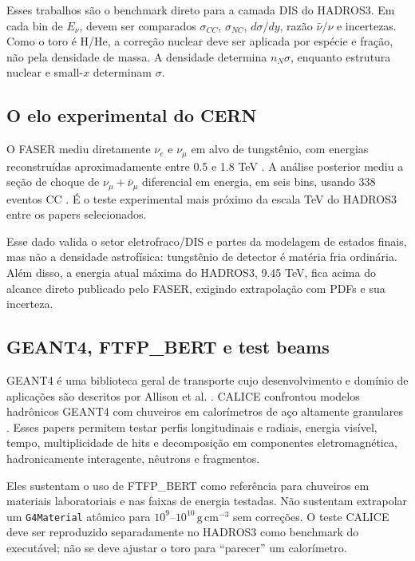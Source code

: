 \documentclass[11pt,a4paper]{article}
\newcommand{\code}[1]{\texttt{#1}}
\begin{document}
Esses trabalhos são o benchmark direto para a camada DIS do HADROS3. Em
cada bin de $E_\nu$, devem ser comparados $\sigma_{CC}$, $\sigma_{NC}$,
$d\sigma/dy$, razão $\bar\nu/\nu$ e incertezas. Como o toro é H/He, a
correção nuclear deve ser aplicada por espécie e fração, não pela densidade
de massa. A densidade determina $n_N\sigma$, enquanto estrutura nuclear e
small-$x$ determinam $\sigma$.

\subsection{O elo experimental do CERN}

O FASER mediu diretamente $\nu_e$ e $\nu_\mu$ em alvo de tungstênio, com
energias reconstruídas aproximadamente entre 0.5 e 1.8 TeV
\cite{FASER2024}. A análise posterior mediu a seção de choque de
$\nu_\mu+\bar\nu_\mu$ diferencial em energia, em seis bins, usando 338
eventos CC \cite{FASER2025}. É o teste experimental mais próximo da escala
TeV do HADROS3 entre os papers selecionados.

Esse dado valida o setor eletrofraco/DIS e partes da modelagem de estados
finais, mas não a densidade astrofísica: tungstênio de detector é matéria
fria ordinária. Além disso, a energia atual máxima do HADROS3, 9.45 TeV,
fica acima do alcance direto publicado pelo FASER, exigindo extrapolação com
PDFs e sua incerteza.

\subsection{GEANT4, FTFP\_BERT e test beams}

GEANT4 é uma biblioteca geral de transporte cujo desenvolvimento e domínio
de aplicações são descritos por Allison et al. \cite{Allison2016Geant4}.
CALICE confrontou modelos hadrônicos GEANT4 com chuveiros em calorímetros de
aço altamente granulares \cite{CALICE2013,CALICE2016,CALICE2019}. Esses
papers permitem testar perfis longitudinais e radiais, energia visível,
tempo, multiplicidade de hits e decomposição em componentes eletromagnética,
hadronicamente interagente, nêutrons e fragmentos.

Eles sustentam o uso de FTFP\_BERT como referência para chuveiros em materiais
laboratoriais e nas faixas de energia testadas. Não sustentam extrapolar um
\code{G4Material} atômico para $10^9$--$10^{10}\,\mathrm{g\,cm^{-3}}$ sem
correções. O teste CALICE deve ser reproduzido separadamente no HADROS3 como
benchmark do executável; não se deve ajustar o toro para ``parecer'' um
calorímetro.
\end{document}
